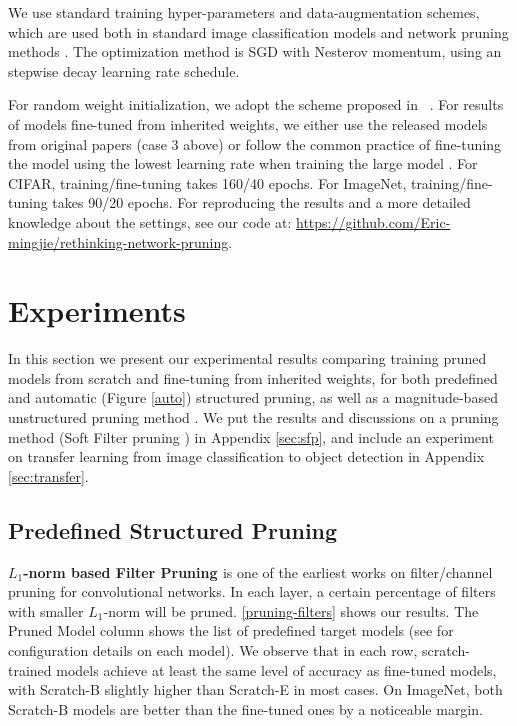 We use standard training hyper-parameters and data-augmentation schemes, which are used both in standard image classification models \citep{resnet, densenet} and network pruning methods \citep{li2016pruning, liu2017learning, huang2018data, he2018sfp}. The optimization method is SGD with Nesterov momentum, using an stepwise decay learning rate schedule.

For random weight initialization, we adopt the scheme proposed in ~\citep{he2015delving}. For results of models fine-tuned from inherited weights, we either use the released models from original papers (case 3 above) or follow the common practice of fine-tuning the model using the lowest learning rate when training the large model \citep{li2016pruning, he2017channel}. For CIFAR, training/fine-tuning takes 160/40 epochs. For ImageNet, training/fine-tuning takes 90/20 epochs. For reproducing the results and a more detailed knowledge about the settings, see our code at: \url{https://github.com/Eric-mingjie/rethinking-network-pruning}.

\section{Experiments}
\label{sec:exp}
In this section we present our experimental results comparing training pruned models from scratch and fine-tuning from inherited weights, for both predefined and automatic (Figure \ref{auto}) structured pruning, as well as a magnitude-based unstructured pruning method \citep{han2015learning}. We put the results and discussions on a pruning method (Soft Filter pruning \citep{he2018sfp}) in Appendix \ref{sec:sfp}, and include an experiment on transfer learning from image classification to object detection in Appendix \ref{sec:transfer}.


\subsection{Predefined Structured Pruning}
\textbf{$L_1$-norm based Filter Pruning \citep{li2016pruning}} is one of the earliest works on filter/channel pruning for convolutional networks. In each layer, a certain percentage of filters with smaller $L_1$-norm will be pruned. 
\autoref{pruning-filters} shows our results. The Pruned Model column shows the list of predefined target models (see \citep{li2016pruning} for configuration details on each model). We observe that in each row, scratch-trained models achieve at least the same level of accuracy as fine-tuned models, with Scratch-B slightly higher than Scratch-E in most cases. On ImageNet, both Scratch-B models are better than the fine-tuned ones by a noticeable margin. 


